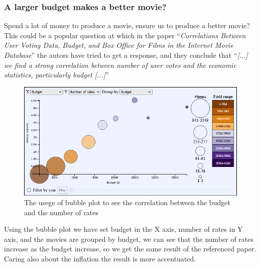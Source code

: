 \documentclass[]{article}
\newcommand{\quotes}[1]{``#1''}
\begin{document}
\subsubsection{A larger budget makes a better movie?}
Spend a lot of money to produce a movie, ensure us to produce a better movie? This could be a popular question at which in the paper \quotes{\emph{Correlations Between User Voting Data, Budget, and Box Office for Films in the Internet Movie Database}} the autors have tried to get a response, and they conclude that \quotes{\emph{[...] we find a strong correlation between number of user votes and the economic statistics, particularly budget [...]}}
\begin{figure}[H]
	\centering
	\includegraphics[width=1\linewidth]{images/insigth_budget}
	\caption{The usege of bubble plot to see the correlation between the budget and the number of rates}
	\label{fig:insigthbudget}
\end{figure}
Using the bubble plot we have set budget in the X axis, number of rates in Y axis, and the movies are grouped by budget, we can see that the number of rates increase as the budget increase, so we get the same result of the referenced paper.\newline
Caring also about the inflation the result is more accentuated. 
\end{document}
